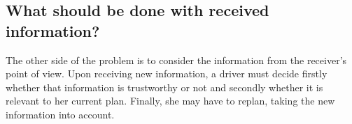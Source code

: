 \documentclass{article}
\begin{document}
%
%
%
%

\subsection{What should be done with received information?}
The other side of the problem is to consider the information from the receiver's point of view. Upon receiving new information, a driver must decide firstly whether that information is trustworthy or not and secondly whether it is relevant to her current plan. Finally, she may have to replan, taking the new information into account.
\end{document}
